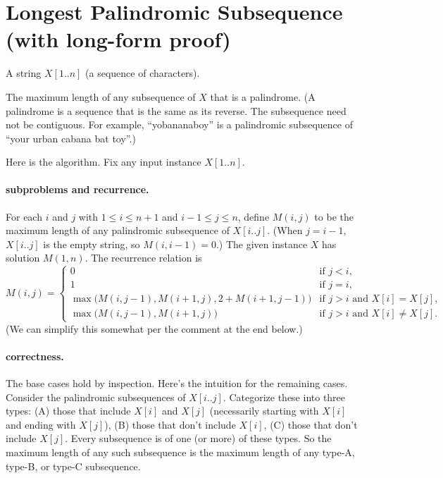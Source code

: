

\section{Longest Palindromic Subsequence (with long-form proof)}\label{dp: sec: LPS}

\begin{mylist}
\item[\bf input:]
  A string $X[1..n]$ (a sequence of characters).
  
\item[\bf output:]
  The maximum length of any subsequence of $X$ that is a palindrome.
  (A palindrome is a sequence that is the same as its reverse.
  The subsequence need not be contiguous.
  For example, ``yobananaboy'' is a palindromic subsequence
  of ``your urban cabana bat toy''.)

\end{mylist}


\noindent
Here is the algorithm.  Fix any input instance $X[1..n]$.

\paragraph{subproblems and recurrence.}
For each $i$ and $j$ with $1\le i \le n+1$ and $i-1\le j \le n$,
define $M(i, j)$ to be the maximum length of any palindromic subsequence of $X[i..j]$.
(When $j = i-1$, $X[i..j]$ is the empty string, so $M(i, i-1) = 0$.)
The given instance $X$ has solution $M(1, n)$.
The recurrence relation is
\[M(i, j)  =
\begin{cases}
  0 & \text{if } j < i, \\
  1 & \text{if } j = i, \\
  \max\big(M(i, j-1), M(i+1, j), 2 + M(i+1, j-1)\big) & \text{if } j>i \text{ and } X[i] = X[j], \\
  \max\big(M(i, j-1), M(i+1, j)\big) & \text{if } j>i \text{ and } X[i] \ne X[j].
\end{cases}
\]
(We can simplify this somewhat per the comment at the end below.)

\paragraph{correctness.}
The base cases hold by inspection.  Here's the intuition for the remaining cases.
Consider the palindromic subsequences of $X[i..j]$.
Categorize these into three types:
(A) those that include $X[i]$ and $X[j]$ (necessarily starting with $X[i]$ and ending with $X[j]$),
(B) those that don't include $X[i]$,
(C) those that don't include $X[j]$.
Every subsequence is of one (or more) of these types.
So the maximum length of any such subsequence
is the maximum length of any type-A, type-B, or type-C subsequence.

